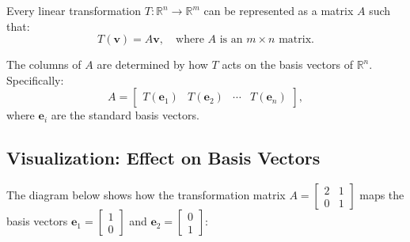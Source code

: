 \documentclass[11pt]{article}
\begin{document}
Every linear transformation \( T: \mathbb{R}^n \to \mathbb{R}^m \) can be represented as a matrix \( A \) such that:
\[
T(\mathbf{v}) = A\mathbf{v}, \quad \text{where } A \text{ is an } m \times n \text{ matrix}.
\]

The columns of \( A \) are determined by how \( T \) acts on the basis vectors of \( \mathbb{R}^n \). Specifically:
\[
A = \begin{bmatrix} T(\mathbf{e}_1) & T(\mathbf{e}_2) & \cdots & T(\mathbf{e}_n) \end{bmatrix},
\]
where \( \mathbf{e}_i \) are the standard basis vectors.

\subsection*{Visualization: Effect on Basis Vectors}

The diagram below shows how the transformation matrix \( A = \begin{bmatrix} 2 & 1 \\ 0 & 1 \end{bmatrix} \) maps the basis vectors \( \mathbf{e}_1 = \begin{bmatrix} 1 \\ 0 \end{bmatrix} \) and \( \mathbf{e}_2 = \begin{bmatrix} 0 \\ 1 \end{bmatrix} \):

\begin{center}
\end{center}
\end{document}
